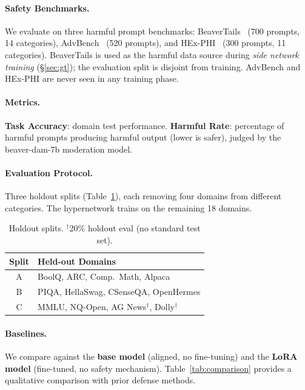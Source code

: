\documentclass[11pt]{article}
\begin{document}
\paragraph{Safety Benchmarks.} We evaluate on three harmful prompt benchmarks: BeaverTails~\cite{ji2024beavertails} (700 prompts, 14 categories), AdvBench~\cite{zou2023universal} (520 prompts), and HEx-PHI~\cite{qi2024hexphi} (300 prompts, 11 categories). BeaverTails is used as the harmful data source during \textit{side network training} (\S\ref{sec:gt}); the evaluation split is disjoint from training. AdvBench and HEx-PHI are never seen in any training phase.

\paragraph{Metrics.} \textbf{Task Accuracy}: domain test performance. \textbf{Harmful Rate}: percentage of harmful prompts producing harmful output (lower is safer), judged by the beaver-dam-7b moderation model.

\paragraph{Evaluation Protocol.} Three holdout splits (Table~\ref{tab:splits}), each removing four domains from different categories. The hypernetwork trains on the remaining 18 domains.

\begin{table}[h]
\centering
\small
\begin{tabular}{@{}cl@{}}
\toprule
\textbf{Split} & \textbf{Held-out Domains} \\
\midrule
A & BoolQ, ARC, Comp.\ Math, Alpaca \\
B & PIQA, HellaSwag, CSenseQA, OpenHermes \\
C & MMLU, NQ-Open, AG News$^\dagger$, Dolly$^\dagger$ \\
\bottomrule
\end{tabular}
\caption{Holdout splits. $^\dagger$20\% holdout eval (no standard test set).}
\label{tab:splits}
\end{table}

\paragraph{Baselines.} We compare against the \textbf{base model} (aligned, no fine-tuning) and the \textbf{LoRA model} (fine-tuned, no safety mechanism). Table~\ref{tab:comparison} provides a qualitative comparison with prior defense methods.
\end{document}
